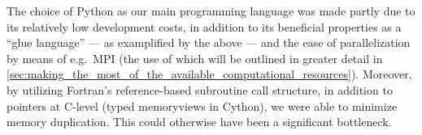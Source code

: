 The choice of Python as our main programming language was made partly due to
its relatively low development costs, in addition to its beneficial properties
as a ``glue language'' --- as examplified by the above --- and the ease of
parallelization by means of e.g.\ MPI (the use of which will be outlined in
greater detail in
\cref{sec:making_the_most_of_the_available_computational_resources}).
Moreover, by utilizing Fortran's reference-based subroutine call structure, in
addition to pointers at C-level (typed memoryviews in Cython), we were able to
minimize memory duplication. This could otherwise have been a significant
bottleneck.

